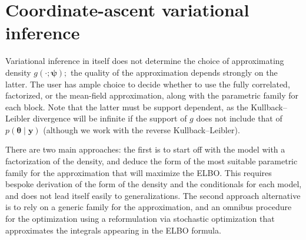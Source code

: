 \documentclass[
  11pt,
  letterpaper,
]{scrbook}
\theoremstyle{definition}
\theoremstyle{plain}
\theoremstyle{plain}
\theoremstyle{plain}
\theoremstyle{definition}
\theoremstyle{definition}
\theoremstyle{plain}
\theoremstyle{plain}
\theoremstyle{remark}
\begin{document}
\section{Coordinate-ascent variational
inference}\label{coordinate-ascent-variational-inference}

Variational inference in itself does not determine the choice of
approximating density \(g(\cdot; \boldsymbol{\psi});\) the quality of
the approximation depends strongly on the latter. The user has ample
choice to decide whether to use the fully correlated, factorized, or the
mean-field approximation, along with the parametric family for each
block. Note that the latter must be support dependent, as the
Kullback--Leibler divergence will be infinite if the support of \(g\)
does not include that of \(p(\boldsymbol{\theta} \mid \boldsymbol{y})\)
(although we work with the reverse Kullback--Leibler).

There are two main approaches: the first is to start off with the model
with a factorization of the density, and deduce the form of the most
suitable parametric family for the approximation that will maximize the
ELBO. This requires bespoke derivation of the form of the density and
the conditionals for each model, and does not lead itself easily to
generalizations. The second approach alternative is to rely on a generic
family for the approximation, and an omnibus procedure for the
optimization using a reformulation via stochastic optimization that
approximates the integrals appearing in the ELBO formula.
\end{document}
